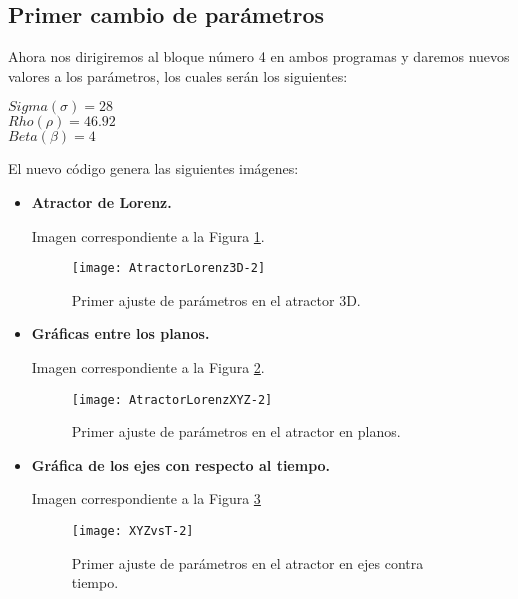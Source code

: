 \subsection{Primer cambio de parámetros}
Ahora nos dirigiremos al bloque número 4 en ambos programas y daremos nuevos valores a los parámetros, los cuales serán los siguientes:

\begin{center}
	$ Sigma ( \sigma ) = 28 $ \\
    $ Rho ( \rho ) = 46.92 $ \\
    $ Beta ( \beta ) = 4 $
\end{center}

El nuevo código genera las siguientes imágenes:

\begin{itemize}
\item \textbf{Atractor de Lorenz.}

Imagen correspondiente a la Figura \ref{fig23:PrimAjus-A}.

\begin{figure}[h!]
	\begin{center}
		\texttt{[image: AtractorLorenz3D-2]}
        \caption{Primer ajuste de parámetros en el atractor 3D.}
        \label{fig23:PrimAjus-A}
	\end{center}
\end{figure}

\item \textbf{Gráficas entre los planos.}

Imagen correspondiente a la Figura \ref{fig24:PrimAjus-B}.

\begin{figure}[h!]
	\begin{center}
		\texttt{[image: AtractorLorenzXYZ-2]}
        \caption{Primer ajuste de parámetros en el atractor en planos.}
        \label{fig24:PrimAjus-B}
	\end{center}
\end{figure}

\item \textbf{Gráfica de los ejes con respecto al tiempo.}

Imagen correspondiente a la Figura \ref{fig25:PrimAjus-C}

\begin{figure}[h!]
	\begin{center}
		\texttt{[image: XYZvsT-2]}
        \caption{Primer ajuste de parámetros en el atractor en ejes contra tiempo.}
        \label{fig25:PrimAjus-C}
	\end{center}
\end{figure}

\end{itemize}


